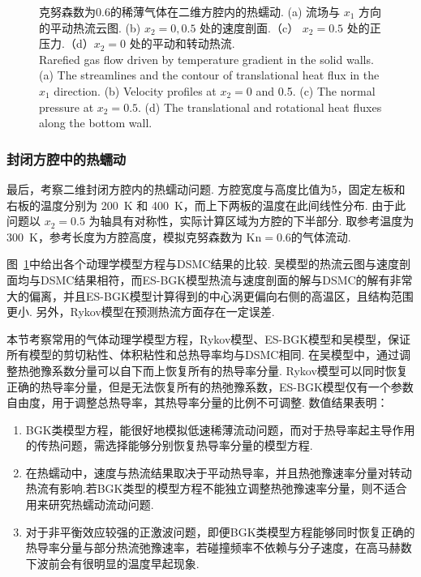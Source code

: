 \begin{figure}[t]
	\caption{克努森数为0.6的稀薄气体在二维方腔内的热蠕动.
		(a) 流场与 $ x_1 $ 方向的平动热流云图. (b) $ x_2=0, 0.5$ 处的速度剖面.（c） $x_2=0.5$ 处的正压力.（d）$x_2=0$ 处的平动和转动热流. \\
		Rarefied gas flow driven by temperature gradient in the solid walls. (a) The streamlines and the contour of translational heat flux in the $x_1$ direction. (b) Velocity profiles at $ x_2=0$ and 0.5. (c) The normal pressure at $x_2=0.5$. (d) The translational and rotational heat fluxes along the bottom wall.
	}
	\label{fig:TC2D}
\end{figure}







\subsubsection{封闭方腔中的热蠕动}

最后，考察二维封闭方腔内的热蠕动问题. 方腔宽度与高度比值为5，固定左板和右板的温度分别为 200~K 和 400~K，而上下两板的温度在此间线性分布. 由于此问题以 $x_2=0.5$ 为轴具有对称性，实际计算区域为方腔的下半部分. 取参考温度为300~K，参考长度为方腔高度，模拟克努森数为 $ \text{Kn}=0.6 $的气体流动.




图~\ref{fig:TC2D}中给出各个动理学模型方程与DSMC结果的比较. 吴模型的热流云图与速度剖面均与DSMC结果相符，而ES-BGK模型热流与速度剖面的解与DSMC的解有非常大的偏离，并且ES-BGK模型计算得到的中心涡更偏向右侧的高温区，且结构范围更小. 另外，Rykov模型在预测热流方面存在一定误差.


本节考察常用的气体动理学模型方程，Rykov模型、ES-BGK模型和吴模型，保证所有模型的剪切粘性、体积粘性和总热导率均与DSMC相同. 在吴模型中，通过调整热弛豫系数分量可以自下而上恢复所有的热导率分量. Rykov模型可以同时恢复正确的热导率分量，但是无法恢复所有的热弛豫系数，ES-BGK模型仅有一个参数自由度，用于调整总热导率，其热导率分量的比例不可调整. 数值结果表明：
\begin{enumerate}
	\item BGK类模型方程，能很好地模拟低速稀薄流动问题，而对于热导率起主导作用的传热问题，需选择能够分别恢复热导率分量的模型方程.
	
	\item 在热蠕动中，速度与热流结果取决于平动热导率，并且热弛豫速率分量对转动热流有影响.若BGK类型的模型方程不能独立调整热弛豫速率分量，则不适合用来研究热蠕动流动问题.
	
	\item 对于非平衡效应较强的正激波问题，即便BGK类模型方程能够同时恢复正确的热导率分量与部分热流弛豫速率，若碰撞频率不依赖与分子速度，在高马赫数下波前会有很明显的温度早起现象.
	
\end{enumerate}




